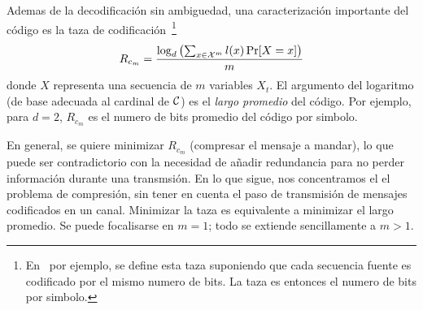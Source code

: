 Ademas de  la decodificaci\'on sin ambiguedad,  una caracterizaci\'on importante
del c\'odigo es la taza de codificaci\'on~\footnote{En~\cite{Rio07} por ejemplo,
  se define esta taza suponiendo que  cada secuencia fuente es codificado por el
  mismo numero de bits. La taza es entonces el numero de bits por simbolo.}
%
\[
R_{c_m} = \frac{\log_d \left( \sum_{x \in \mathcal{X}^m} l(x) \Pr[X = x] \right)}{m}
\]
%
donde $X$  representa una  secuencia de $m$  variables $X_t$.  El  argumento del
logaritmo (de base adecuada al cardinal  de $\mathcal{C}$) es el {\it largo promedio} del
c\'odigo. Por ejemplo, para $d = 2$, $R_{c_m}$ es el numero de bits promedio del
c\'odigo por simbolo.

En general,  se quiere minimizar $R_{c_m}$  (compresar el mensaje  a mandar), lo
que puede  ser contradictorio con la  necesidad de a\~nadir  redundancia para no
perder informaci\'on durante una transmsi\'on. En lo que sigue, nos concentramos
el el problema de compresi\'on, sin  tener en cuenta el paso de transmisi\'on de
mensajes codificados en  un canal. Minimizar la taza  es equivalente a minimizar
el largo promedio.  Se puede focalisarse  en $m = 1$; todo se
extiende sencillamente a $m > 1$.

